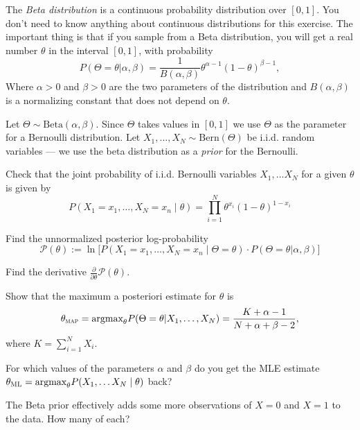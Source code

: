 \documentclass[a4paper,10pt,landscape,twocolumn]{scrartcl}
\begin{document}
\begin{exercise}
	The \emph{Beta distribution} is a continuous probability distribution over $[0,1]$. You don't need to know anything about continuous distributions for this exercise. The important thing is that if you sample from a Beta distribution, you will get a real number $\theta$ in the interval $[0, 1]$, with probability
	\[
		P(\Theta = \theta|\alpha, \beta) = \frac{1}{B(\alpha, \beta)} \theta^{\alpha-1} (1-\theta)^{\beta-1},
	\] 
	Where $\alpha > 0$ and $\beta > 0$ are the two parameters of the distribution and $B(\alpha, \beta)$ is a normalizing constant that does not depend on $\theta$.

	Let $\Theta \sim \text{Beta}(\alpha, \beta)$. Since $\Theta$ takes values in $[0,1]$ we use $\Theta$ as the parameter for a Bernoulli distribution. Let $X_1, \dots, X_N \sim \text{Bern}(\Theta)$ be i.i.d. random variables --- we use the beta distribution as a \emph{prior} for the Bernoulli.
	
	\begin{subex}
	Check that the joint probability of i.i.d. Bernoulli variables $X_1, \dots X_N$ for a given $\theta$ is given by
	\[
	P(X_1=x_1, \dots, X_N=x_n \mid \theta) = \prod_{i=1}^N \theta^{x_i} (1-\theta)^{1-x_i}
	\]	
	\end{subex}

	\begin{subex}
		Find the unnormalized posterior log-probability 
		\[
			\mathcal P(\theta) := \ln \bigl[ P(X_1=x_1, \dots, X_N=x_n \mid \Theta=\theta) \cdot P(\Theta = \theta| \alpha, \beta)\bigr]
		\]
	\end{subex}

	\begin{subex}
	Find the derivative $\frac{\partial}{\partial \theta} \mathcal P(\theta)$.	
	\end{subex}
	
	\begin{subex}
	Show that the maximum a posteriori estimate 	for $\theta$ is 
	\[
		\theta_\textsc{map} 
			= \text{argmax}_\theta P(\Theta = \theta | X_1, \dots, X_N)
			= \frac{K + \alpha - 1}{N + \alpha + \beta - 2}, 
	\]
	where $K = \sum_{i=1}^N X_i$.
	\end{subex}
	
	\begin{subex}
		For which values of the parameters $\alpha$ and $\beta$ do you get the MLE estimate $\theta_\textsc{ML} = \text{argmax}_\theta P(X_1, \dots X_N \mid \theta)$ back? 
	\end{subex}

	\begin{subex}
		The Beta prior effectively adds some more observations of $X=0$ and $X=1$ to the data. How many of each? 
	\end{subex}
\end{exercise}
\end{document}
